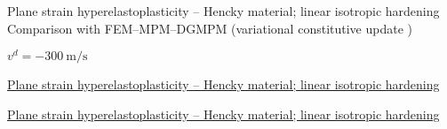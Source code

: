 
\begin{frame}{Plane strain hyperelastoplasticity -- Hencky material; linear isotropic hardening}
  \footnotesize Comparison with FEM--MPM--DGMPM (variational constitutive update \cite{LaurentVariational})
  \centering
  
  \footnotesize $v^d = -300 \: \text{m/s}$
  
\end{frame}

\begin{frame}{\href{section4/animation/hyperelastoplasticity/stress.mp4}{Plane strain hyperelastoplasticity -- Hencky material; linear isotropic hardening}}
  \begin{center}
  \end{center}
\end{frame}


\begin{frame}{\href{section4/animation/hyperelastoplasticity/epeq.mp4}{Plane strain hyperelastoplasticity -- Hencky material; linear isotropic hardening}}
  \begin{center}
  \end{center}
\end{frame}



\begin{frame}
  \begin{columns}
    \begin{column}{0.49\textwidth}
      
    \end{column}
    \begin{column}{0.49\textwidth}
      
    \end{column}
  \end{columns}
\end{frame}
